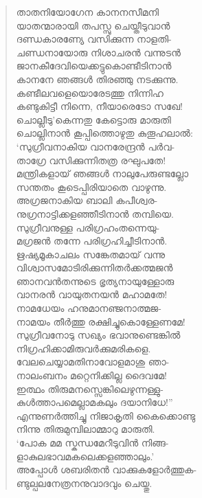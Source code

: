 \begin{verse}
താതനിയോഗേന കാനനസീമനി\\
യാതന്മാരായി തപസ്സു ചെയ്തീടുവാന്‍\\
ദണ്ഡകാരണ്യേ വസിക്കുന്ന നാളതി-\\
ചണ്ഡനായോരു നിശാചരന്‍ വന്നുടന്‍\\
ജാനകീദേവിയെക്കട്ടുകൊണ്ടീടിനാന്‍\\
കാനനേ ഞങ്ങള്‍ തിരഞ്ഞു നടക്കുന്നു.\\
കണ്ടീലവളെയൊരേടത്തു നിന്നിഹ\\
കണ്ടുകിട്ടീ നിന്നെ, നീയാരെടോ സഖേ!\\
ചൊല്ലീടു’കെന്നതു കേട്ടൊരു മാരുതി\\
ചൊല്ലിനാന്‍ കൂപ്പിത്തൊഴുതു കുതൂഹലാല്‍:\\
‘സുഗ്രീവനാകിയ വാനരേന്ദ്രന്‍ പര്‍വ-\\
താഗ്രേ വസിക്കുന്നിതത്ര രഘുപതേ!\\
മന്ത്രികളായ് ഞങ്ങള്‍ നാലുപേരുണ്ടല്ലോ\\
സന്തതം കൂടെപ്പിരിയാതെ വാഴുന്നു.\\
അഗ്രജനാകിയ ബാലി കപീശ്വര-\\
നുഗ്രനാട്ടിക്കളഞ്ഞീടിനാന്‍ തമ്പിയെ.\\
സുഗ്രീവനുള്ള പരിഗ്രഹംതന്നെയു-\\
മഗ്രജന്‍ തന്നേ പരിഗ്രഹിച്ചീടിനാന്‍.\\
ഋഷ്യമൂകാചലം സങ്കേതമായ് വന്നു\\
വിശ്വാസമോടിരിക്കുന്നിതര്‍ക്കത്മജന്‍\\
ഞാനവന്‍തന്നുടെ ഭൃത്യനായുള്ളോരു\\
വാനരന്‍ വായുതനയന്‍ മഹാമതേ!\\
നാമധേയം ഹനുമാനഞ്ജനാത്മജ-\\
നാമയം തീര്‍ത്തു രക്ഷിച്ചുകൊള്ളേണമേ!\\
സുഗ്രീവനോടു സഖ്യം ഭവാനുണ്ടെങ്കില്‍\\
നിഗ്രഹിക്കാമിരുവര്‍ക്കുമരികളെ.\\
വേലചെയ്യാമതിനാവോളമാശു ഞാ-\\
നാലംബനം മറ്റെനിക്കില്ല ദൈവമേ!\\
ഇത്ഥം തിരുമനസ്സെങ്കിലെഴുന്നള്ളു-\\
കുള്‍ത്താപമെല്ലാമകലും ദയാനിധേ!”\\
എന്നുണര്‍ത്തിച്ചു നിജാകൃതി കൈക്കൊണ്ടു\\
നിന്നു തിരുമുമ്പിലാമ്മാറു മാരുതി.\\
‘പോക മമ സ്കന്ധമേറീടുവിന്‍ നിങ്ങ-\\
ളാകുലഭാവമകലെക്കളഞ്ഞാലും.’\\
അപ്പോള്‍ ശബരിതന്‍ വാക്കുകളോര്‍ത്തുക-\\
ണ്ടുല്പലനേത്രനനുവാദവും ചെയ്തു.
\end{verse}

